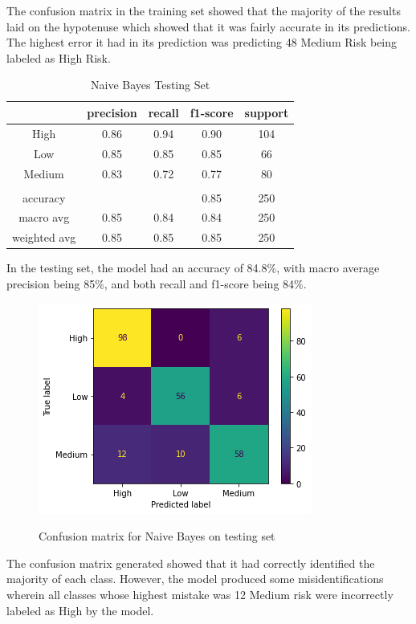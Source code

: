 \documentclass[runningheads]{llncs}
\begin{document}
The confusion matrix in the training set showed that the majority of the results laid on the hypotenuse which showed that it was fairly accurate in its predictions. The highest error it had in its prediction was predicting 48 Medium Risk being labeled as High Risk.
\newpage

\begin{table}[ht]
\centering
\caption{Naive Bayes Testing Set} \vspace{0.25em}
\begin{tabular}{|c|c|c|c|c|} \hline
 & precision & recall & f1-score & support \\ \hline
High   & 0.86 & 0.94 & 0.90 & 104 \\ \hline
Low    & 0.85 & 0.85 & 0.85 & 66 \\ \hline
Medium & 0.83 & 0.72 & 0.77 & 80 \\ \hline
& & & & \\ \hline
accuracy     & & & 0.85 & 250 \\ \hline
macro avg    & 0.85 & 0.84 & 0.84 & 250 \\ \hline
weighted avg & 0.85 & 0.85 & 0.85 & 250 \\ \hline
\end{tabular}
\label{tab:naivebayes-testing}
\end{table}

In the testing set, the model had an accuracy of 84.8\%, with macro average precision being 85\%, and both recall and f1-score being 84\%.

\begin{figure}[ht]           	 
\centering               	 
\caption{Confusion matrix for Naive Bayes on testing set}
\includegraphics[scale=0.5]{naivebayes-CM-testing.png}  	 
\label{fig:naivebayes-CM-testing}
\end{figure}

The confusion matrix generated showed that it had correctly identified the majority of each class. However, the model produced some misidentifications wherein all classes whose highest mistake was 12 Medium risk were incorrectly labeled as High by the model. 
\end{document}
